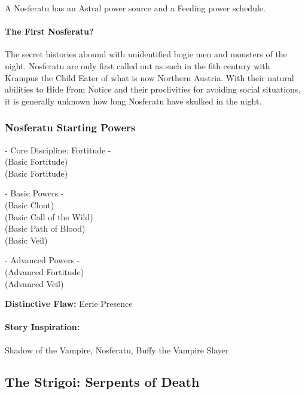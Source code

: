 A Nosferatu has an Astral power source and a Feeding power schedule.

\paragraph{The First Nosferatu?} The secret histories abound with unidentified bogie men and monsters of the night. Nosferatu are only first called out as such in the 6th century with Krampus the Child Eater of what is now Northern Austria. With their natural abilities to Hide From Notice and their proclivities for avoiding social situations, it is generally unknown how long Nosferatu have skulked in the night.

\subsubsection{Nosferatu Starting Powers}

\hspace{\parindent} - Core Discipline: Fortitude -\\
 (Basic Fortitude)\\
 (Basic Fortitude)

- Basic Powers -\\
 (Basic Clout)\\
 (Basic Call of the Wild)\\
 (Basic Path of Blood)\\
 (Basic Veil)

- Advanced Powers -\\
 (Advanced Fortitude)\\
 (Advanced Veil)

\textbf{Distinctive Flaw:} Eerie Presence

\paragraph{Story Inspiration:} Shadow of the Vampire, Nosferatu, Buffy the Vampire Slayer

\subsection[Strigoi]{The Strigoi: Serpents of Death} 


